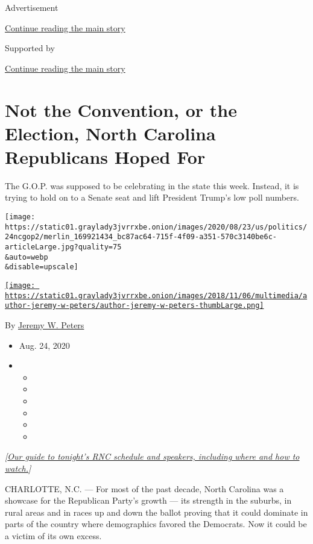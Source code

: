 Advertisement

\protect\hyperlink{after-top}{Continue reading the main story}

Supported by

\protect\hyperlink{after-sponsor}{Continue reading the main story}

\hypertarget{not-the-convention-or-the-election-north-carolina-republicans-hoped-for}{%
\section{Not the Convention, or the Election, North Carolina Republicans
Hoped
For}\label{not-the-convention-or-the-election-north-carolina-republicans-hoped-for}}

The G.O.P. was supposed to be celebrating in the state this week.
Instead, it is trying to hold on to a Senate seat and lift President
Trump's low poll numbers.

\texttt{[image: https://static01.graylady3jvrrxbe.onion/images/2020/08/23/us/politics/24ncgop2/merlin\_169921434\_bc87ac64-715f-4f09-a351-570c3140be6c-articleLarge.jpg?quality=75\\\&auto=webp\\\&disable=upscale]}

\href{https://www.nytimes3xbfgragh.onion/by/jeremy-w-peters}{\texttt{[image: https://static01.graylady3jvrrxbe.onion/images/2018/11/06/multimedia/author-jeremy-w-peters/author-jeremy-w-peters-thumbLarge.png]}}

By \href{https://www.nytimes3xbfgragh.onion/by/jeremy-w-peters}{Jeremy
W. Peters}

\begin{itemize}
\item
  Aug. 24, 2020
\item
  \begin{itemize}
  \item
  \item
  \item
  \item
  \item
  \item
  \end{itemize}
\end{itemize}

\emph{{[}}\href{https://www.nytimes3xbfgragh.onion/2020/08/24/us/politics/how-to-watch-the-republican-national-convention.html}{\emph{Our
guide to tonight's RNC schedule and speakers, including where and how to
watch.}}\emph{{]}}

CHARLOTTE, N.C. --- For most of the past decade, North Carolina was a
showcase for the Republican Party's growth --- its strength in the
suburbs, in rural areas and in races up and down the ballot proving that
it could dominate in parts of the country where demographics favored the
Democrats. Now it could be a victim of its own excess.

